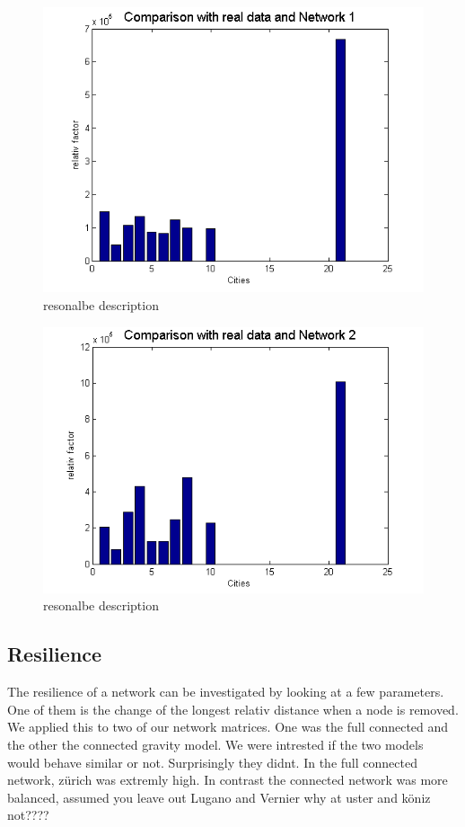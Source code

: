 \documentclass[11pt]{article}
\begin{document}
\begin{figure}
\includegraphics[scale=0.5]{compare1}
 \caption{resonalbe description}
\end{figure}

\begin{figure}
\includegraphics[scale=0.5]{compare2}
 \caption{resonalbe description}
\end{figure}



\subsection{Resilience}

The resilience of a network can be investigated by looking at a few parameters. One of them is the change of the longest relativ distance when a node is removed. We applied this to two of our network matrices. One was the full connected and the other the connected gravity model. We were intrested if the two models would behave similar or not. Surprisingly they didnt. In the full connected network, zürich was extremly high. In contrast the connected network was more balanced, assumed you leave out Lugano and Vernier why at uster and köniz not????
\end{document}
